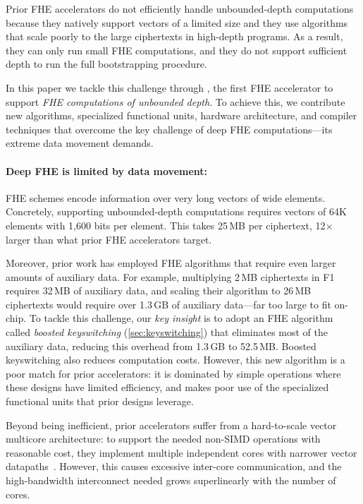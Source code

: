 Prior FHE accelerators do not efficiently handle unbounded-depth computations because
they natively support vectors of a limited size and they use algorithms that scale poorly
to the large ciphertexts in high-depth programs.
As a result, they can only run small FHE computations, and they do not support sufficient depth
to run the full bootstrapping procedure.

\figWorkflow

In this paper we tackle this challenge through \name, the first FHE accelerator
to support \emph{FHE computations of unbounded depth}.
To achieve this, we contribute new algorithms, specialized functional units,
hardware architecture, and compiler techniques that overcome the key challenge
of deep FHE computations---its extreme data movement demands.

\paragraph{Deep FHE is limited by data movement:}
FHE schemes encode information over very long vectors of wide elements.
Concretely, supporting unbounded-depth computations requires vectors of
64K elements with 1,600 bits per element.
This takes 25\,MB per ciphertext, 12$\times$ larger than what prior FHE accelerators target.

Moreover, prior work has employed FHE algorithms that require even larger amounts of auxiliary data.
For example, multiplying 2\,MB ciphertexts in F1~\cite{feldmann:micro21:f1} requires 32\,MB of auxiliary data,
and scaling their algorithm to 26\,MB ciphertexts would require over
1.3\,GB 
of auxiliary data---far too large to fit on-chip.
To tackle this challenge, our \emph{key insight} is to adopt an FHE
algorithm called \emph{boosted keyswitching} (\autoref{sec:keyswitching}) that eliminates most of the
auxiliary data,
reducing this overhead from 1.3\,GB to 52.5\,MB.
Boosted keyswitching also reduces computation costs.
However, this new algorithm is a poor match for prior accelerators:
it is dominated by simple operations where these designs have limited efficiency,
and makes poor use of the specialized functional units that prior designs leverage.

Beyond being inefficient, prior accelerators suffer from a hard-to-scale vector multicore architecture:
to support the needed non-SIMD operations with reasonable cost,
they implement multiple independent cores with narrower vector datapaths~\cite{feldmann:micro21:f1}.
However, this causes excessive inter-core communication,
and the high-bandwidth interconnect
needed grows superlinearly with the number of cores.


